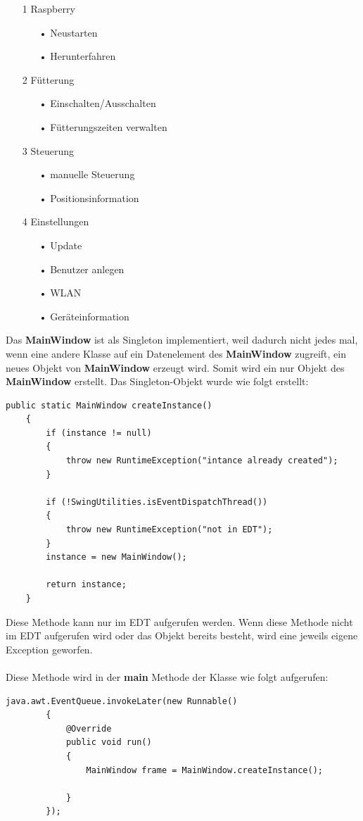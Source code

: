\begin{itemize}
\item[1] Raspberry
\begin{itemize}
\item[•] Neustarten
\item[•] Herunterfahren
\end{itemize}
\item[2] Fütterung
\begin{itemize}
\item[•] Einschalten/Ausschalten
\item[•] Fütterungszeiten verwalten
\end{itemize}
\item[3] Steuerung
\begin{itemize}
\item[•] manuelle Steuerung
\item[•] Positionsinformation
\end{itemize}
\item[4] Einstellungen
\begin{itemize}
\item[•] Update
\item[•] Benutzer anlegen
\item[•] WLAN
\item[•] Geräteinformation
\end{itemize}
\end{itemize}

\vspace{10pt}

Das \textbf{MainWindow} ist als Singleton implementiert, weil dadurch nicht jedes mal, wenn eine andere Klasse auf ein Datenelement des \textbf{MainWindow} zugreift, ein neues Objekt von \textbf{MainWindow} erzeugt wird. Somit wird ein nur Objekt des \textbf{MainWindow} erstellt. Das Singleton-Objekt wurde wie folgt erstellt:
\begin{lstlisting}[style=JavaStyle, caption=MainWindow createInstance()]
public static MainWindow createInstance()
    {
        if (instance != null)
        {
            throw new RuntimeException("intance already created");
        }

        if (!SwingUtilities.isEventDispatchThread())
        {
            throw new RuntimeException("not in EDT");
        }
        instance = new MainWindow();

        return instance;
    }
\end{lstlisting}
Diese Methode kann nur im EDT aufgerufen werden. Wenn diese Methode nicht im EDT aufgerufen wird oder das Objekt bereits besteht, wird eine jeweils eigene Exception geworfen.
\\ \\ Diese Methode wird in der \textbf{main} Methode der Klasse wie folgt aufgerufen:
\begin{lstlisting}[style=JavaStyle, caption=MainWindow createInstance() Aufruf]
	java.awt.EventQueue.invokeLater(new Runnable()
        {
            @Override
            public void run()
            {
                MainWindow frame = MainWindow.createInstance();

            }
        });
\end{lstlisting}

